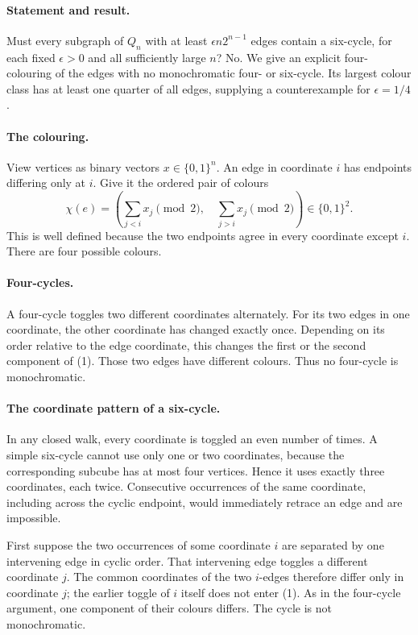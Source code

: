 \paragraph{Statement and result.}
Must every subgraph of \(Q_n\) with at least \(\epsilon n2^{n-1}\) edges contain a six-cycle, for each fixed \(\epsilon>0\) and all sufficiently large \(n\)? No. We give an explicit four-colouring of the edges with no monochromatic four- or six-cycle. Its largest colour class has at least one quarter of all edges, supplying a counterexample for \(\epsilon=1/4\).

\paragraph{The colouring.}
View vertices as binary vectors \(x\in\{0,1\}^n\). An edge in coordinate \(i\) has endpoints differing only at \(i\). Give it the ordered pair of colours
\[
 \chi(e)=\left(\sum_{j<i}x_j\pmod2,\quad
                    \sum_{j>i}x_j\pmod2\right)\in\{0,1\}^2. \tag{1}
\]
This is well defined because the two endpoints agree in every coordinate except \(i\). There are four possible colours.

\paragraph{Four-cycles.}
A four-cycle toggles two different coordinates alternately. For its two edges in one coordinate, the other coordinate has changed exactly once. Depending on its order relative to the edge coordinate, this changes the first or the second component of (1). Those two edges have different colours. Thus no four-cycle is monochromatic.

\paragraph{The coordinate pattern of a six-cycle.}
In any closed walk, every coordinate is toggled an even number of times. A simple six-cycle cannot use only one or two coordinates, because the corresponding subcube has at most four vertices. Hence it uses exactly three coordinates, each twice. Consecutive occurrences of the same coordinate, including across the cyclic endpoint, would immediately retrace an edge and are impossible.

First suppose the two occurrences of some coordinate \(i\) are separated by one intervening edge in cyclic order. That intervening edge toggles a different coordinate \(j\). The common coordinates of the two \(i\)-edges therefore differ only in coordinate \(j\); the earlier toggle of \(i\) itself does not enter (1). As in the four-cycle argument, one component of their colours differs. The cycle is not monochromatic.

